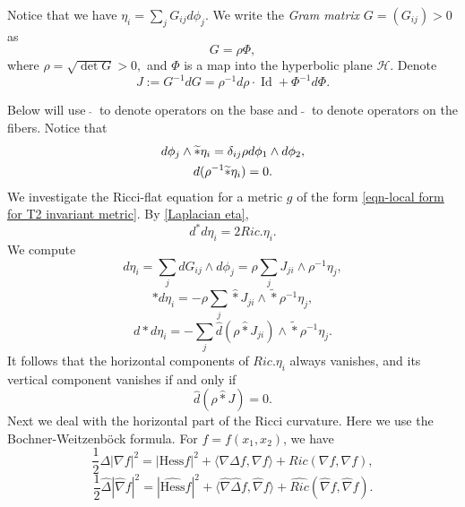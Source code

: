 \documentclass[a4paper,11pt]{amsart}
\theoremstyle{definition}
\numberwithin{equation}{section}
\DeclareMathOperator{\Id}{Id}
\begin{document}
Notice that we have $\eta_i=\sum_jG_{ij}d\phi_j$. We write  the \emph{Gram matrix} $G=(G_{ij})>0$ as $$G=\rho\Phi,$$
 where $\rho=\sqrt{\det G}>0,$ and $\Phi$ is a map into the hyperbolic plane $\mathcal H$. 
Denote \begin{equation}\label{defining equation for J-2}J:=G^{-1}dG=\rho^{-1}d\rho\cdot \Id+\Phi^{-1}d\Phi.
\end{equation}



\noindent Below will use $\ \widehat{}\ $ to denote operators on the base and $\ \widetilde{} \ $ to denote operators on the fibers. Notice that
\begin{gather}
	d\phi_j\wedge \widetilde{*}\eta_i=\delta_{ij} \rho d\phi_1\wedge d\phi_2,\notag\\
	d(\rho^{-1}\widetilde{*}\eta_i)=0.\notag
\end{gather} 
\noindent We investigate the Ricci-flat equation for a metric $g$ of the form  \eqref{eqn-local form for T2 invariant metric}.  By  \eqref{Laplacian eta},  
\begin{equation}
	d^*d\eta_i=2Ric.\eta_i.
\end{equation}
We compute \begin{equation}
 	d\eta_i=\sum_jd G_{ij}\wedge d\phi_j=\rho\sum_j J_{ji}\wedge \rho^{-1}\eta_j,
\end{equation}
\begin{equation}
	*d\eta_i=-\rho\sum_j\widehat{*} J_{ji}\wedge \widetilde{*}\rho^{-1}\eta_j,
\end{equation}
\begin{equation}
d*d\eta_i=-\sum_j\widehat d(\rho\widehat{*}J_{ji})\wedge \widetilde{*}\rho^{-1}\eta_j.
\end{equation}
It follows that the horizontal components of $Ric.\eta_i$ always vanishes,  and its vertical component vanishes if and only if 
\begin{equation}
	\widehat d(\rho \widehat{*}J)=0.
\end{equation}
Next we deal with the horizontal part of the Ricci curvature. Here we use the Bochner-Weitzenb\"ock formula. For $f=f(x_1, x_2)$, we have
\begin{equation}\label{Weitzenbock1}
	\frac{1}{2}\Delta|\nabla f|^2=|\text{Hess}f|^2+\langle \nabla \Delta f, \nabla f\rangle+Ric(\nabla f, \nabla f),
\end{equation}
\begin{equation}\label{Weitzenbock2}
	\frac{1}{2}\widehat\Delta|\widehat{\nabla} f|^2=|\widehat{\text{Hess}}f|^2+\langle \widehat{\nabla} \widehat\Delta f, \widehat{\nabla} f\rangle+\widehat{Ric}(\widehat{\nabla} f, \widehat{\nabla} f).
\end{equation}
\end{document}
